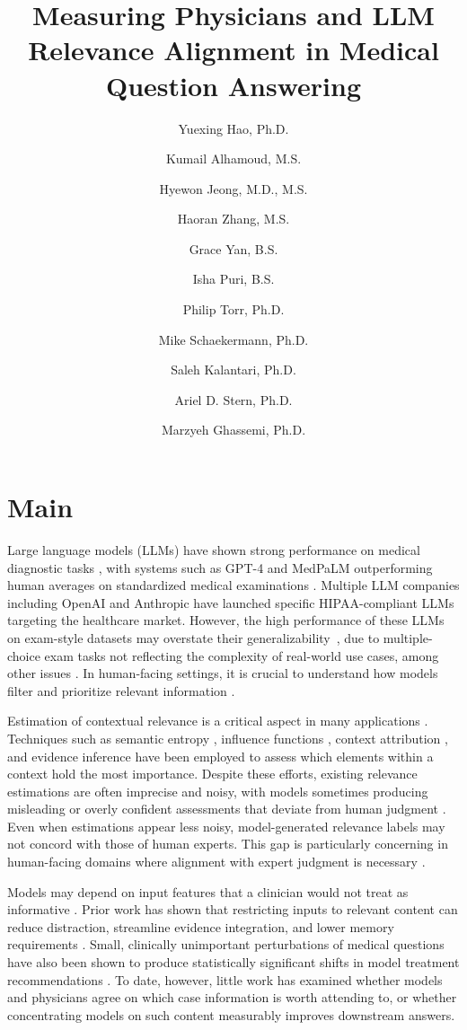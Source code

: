 \documentclass[fleqn,10pt]{wlscirep}
\title{Measuring Physicians and LLM Relevance Alignment in Medical Question Answering}
\author[1,2 *]{Yuexing Hao, Ph.D.}
\author[1]{Kumail Alhamoud, M.S.}
\author[1]{Hyewon Jeong, M.D., M.S.}
\author[1]{Haoran Zhang, M.S.}
\author[1]{Grace Yan, B.S.}
\author[1]{Isha Puri, B.S.}
\author[3]{Philip Torr, Ph.D.}
\author[6]{Mike Schaekermann, Ph.D.}
\author[2]{Saleh Kalantari, Ph.D.}
\author[4,5]{Ariel D. Stern, Ph.D.}
\author[1]{Marzyeh Ghassemi, Ph.D.}
\affil[1]{Massachusetts Institute of Technology, Cambridge, MA, 02139, USA}
\affil[2]{Cornell University, Ithaca, NY, 14850, USA}
\affil[3]{University of Oxford, Oxford, UK}
\affil[4]{Hasso Plattner Institute, Potsdam, Germany}
\affil[5]{University of Potsdam, Potsdam, Germany}
\affil[6]{Independent Researcher}
\affil[*]{Corresponding Author: yuexing@mit.edu}
\begin{document}
\flushbottom
\maketitle

\section{Main}

Large language models (LLMs) have shown strong performance on medical diagnostic tasks \cite{de2025we}, with systems such as GPT-4 \cite{openai_gpt-4_2024} and MedPaLM \cite{singhal2023large} outperforming human averages on standardized medical examinations \cite{cabral_clinical_2024, mcduff_towards_2025, liu2025generalist, holmes2025radonc, van2024adapted}. Multiple LLM companies including OpenAI and Anthropic have launched specific HIPAA-compliant LLMs targeting the healthcare market. However, the high performance of these LLMs on exam-style datasets may overstate their generalizability~\cite{li_mediq_2024, hao2025large, deng-etal-2024-investigating}, due to multiple-choice exam tasks not reflecting the complexity of real-world use cases, among other issues \cite{xia_cares_2024}. In human-facing settings, it is crucial to understand how models filter and prioritize relevant information \cite{park_does_2015}.

Estimation of contextual relevance is a critical aspect in many applications \cite{KonopaskyArtinoBattistaOhmerHemmerTorreRamanivanMerrienboerTeunissenMcBeeRatcliffeDurning+2020+257+264, sayres2025towards, hao2024outcome}. Techniques such as semantic entropy \cite{farquhar_detecting_2024}, influence functions \cite{choe_what_2024}, context attribution \cite{cohen-wang_learning_2025, liuattribot2024}, and evidence inference \cite{deyoung_eraser_2020} have been employed to assess which elements within a context hold the most importance. Despite these efforts, existing relevance estimations are often imprecise and noisy, with models sometimes producing misleading or overly confident assessments that deviate from human judgment \cite{es_ragas_2024}. Even when estimations appear less noisy, model-generated relevance labels may not concord with those of human experts. This gap is particularly concerning in human-facing domains where alignment with expert judgment is necessary \cite{zhao_moverscore_2019, schuler_context_2025}. 

Models may depend on input features that a clinician would not treat as informative \cite{adam2022mitigating}. Prior work has shown that restricting inputs to relevant content can reduce distraction, streamline evidence integration, and lower memory requirements \cite{khattab_baleen_2021, chuang_selfcite_2025, lu_learn_2022, bucinca_trust_2021}. Small, clinically unimportant perturbations of medical questions have also been shown to produce statistically significant shifts in model treatment recommendations \cite{gourabathina2025medium}. To date, however, little work has examined whether models and physicians agree on which case information is worth attending to, or whether concentrating models on such content measurably improves downstream answers.
\end{document}
